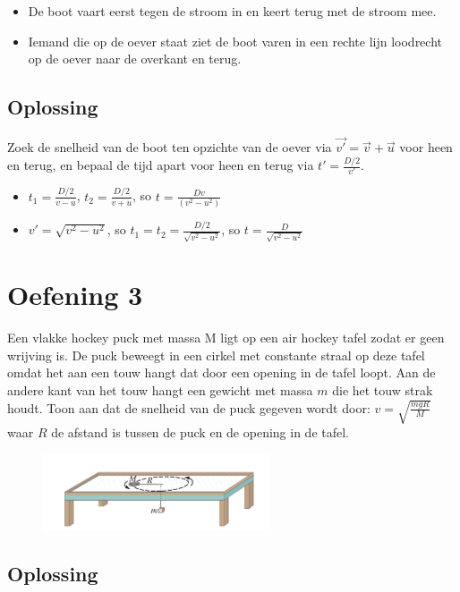 \documentclass[11pt]{article}
\begin{document}
\begin{itemize}
	\item De boot vaart eerst tegen de stroom in en keert terug met de stroom mee.
	\item Iemand die op de oever staat ziet de boot varen in een rechte lijn loodrecht op de oever naar de overkant en terug.
\end{itemize}

\subsection{Oplossing}
Zoek de snelheid van de boot ten opzichte van de oever via $\vec{v'}= \vec{v} + \vec{u}$ voor heen en terug, en bepaal de tijd apart voor heen en terug via $t' = \frac{D/2}{v'}$.

\begin{itemize}
	\item $t_1 = \frac{D/2}{v-u}$, $t_2 = \frac{D/2}{v+u}$, so $t=\frac{Dv}{(v^2 - u^2)}$
	\item $v' = \sqrt{v^2 - u^2}$, so $t_1 = t_2 = \frac{D/2}{\sqrt{v^2 - u^2}}$, so $t = \frac{D}{\sqrt{v^2 - u^2}}$
\end{itemize}

\section{Oefening 3}
Een vlakke hockey puck met massa M ligt op een air hockey tafel zodat er geen wrijving is.
De puck beweegt in een cirkel met constante straal op deze tafel omdat het aan een touw hangt dat door een opening in de tafel loopt.
Aan de andere kant van het touw hangt een gewicht met massa $m$ die het touw strak houdt.
Toon aan dat de snelheid van de puck gegeven wordt door: $v = \sqrt{\frac{mgR}{M}}$ waar $R$ de afstand is tussen de puck en de opening in de tafel.

\begin{figure}
\centering
	\includegraphics[width=0.6\textwidth]{hockeypuck}
	\caption{}
	\label{fig:hockeypuck}
\end{figure}

\subsection{Oplossing}
\end{document}
